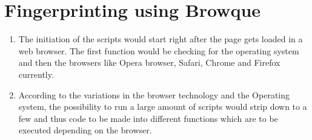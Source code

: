\documentclass[journal]{IEEEtran}
\begin{document}
\section{Fingerprinting using Browque}
\begin{enumerate}
\item The initiation of the scripts would start right after the page gets loaded in a web browser. The first function would be checking for the operating system and then the browsers like Opera browser, Safari, Chrome and Firefox currently. 
\item According to the variations in the browser technology and the Operating system, the possibility to run a large amount of scripts would strip down to a few and thus code to be made into different functions which are to be executed depending on the browser.

\end{enumerate}
\end{document}
